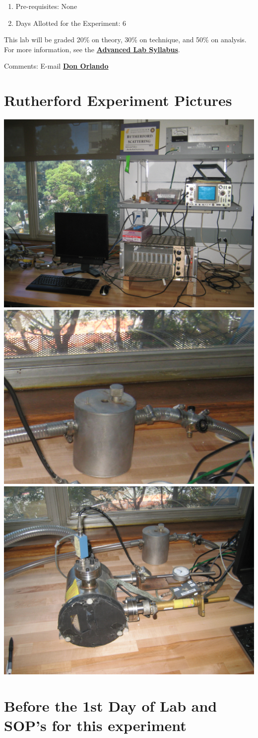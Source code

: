 \documentclass{../lab}
\begin{document}
\begin{enumerate}
    \item Pre-requisites: None

    \item Days Allotted for the Experiment: 6
\end{enumerate}

This lab will be graded 20\% on theory, 30\% on technique, and 50\% on analysis. For more information, see the \href{\AdvancedLabSyllabus}{\textbf{Advanced Lab Syllabus}}.

Comments: E-mail \href{\MailDonOrlando}{\textbf{Don Orlando}}

\section{Rutherford Experiment Pictures}

\noindent
\href{http://experimentationlab.berkeley.edu/sites/default/files/images/RUT_3512.jpg}{\includegraphics[width=0.33\linewidth,keepaspectratio]{images/RUT_3512.jpg}}
\href{http://experimentationlab.berkeley.edu/sites/default/files/images/RUT_Valve.jpg}{\includegraphics[width=0.33\linewidth,keepaspectratio]{images/RUT_Valve.jpg}}
\href{http://experimentationlab.berkeley.edu/sites/default/files/images/RUT_Chamber.jpg}{\includegraphics[width=0.33\linewidth,keepaspectratio]{images/RUT_Chamber.jpg}}

\section{Before the 1st Day of Lab and SOP's for this experiment}
\end{document}
